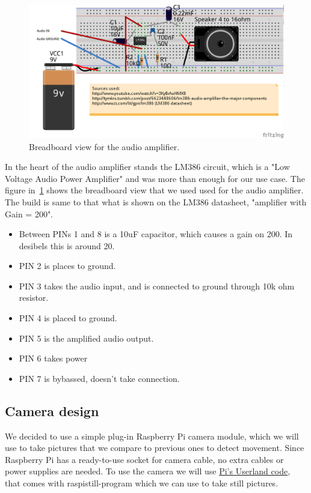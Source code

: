 \documentclass[english,11pt,twoside,a4paper]{article}
\begin{document}
\begin{figure}
  \begin{center}
    \includegraphics[scale=0.75]{audio_amplifier_lm386_bb.png}
    \caption{Breadboard view for the audio amplifier.}
  \end{center}
  \label{lm386_bb}
\end{figure}

In the heart of the audio amplifier stands the LM386 circuit, which is a "Low Voltage Audio Power Amplifier" and was more than enough for our use case. The figure in~\ref{lm386_bb} shows the breadboard view that we used used for the audio amplifier. The build is same to that what is shown on the LM386 datasheet, "amplifier with Gain = 200".

\begin{itemize}
  \item Between PINs 1 and 8 is a 10uF capacitor, which causes a gain on 200. In desibels this is around 20.
  \item PIN 2 is places to ground.
  \item PIN 3 takes the audio input, and is connected to ground through 10k ohm resistor.
  \item PIN 4 is placed to ground.
  \item PIN 5 is the amplified audio output.
  \item PIN 6 takes power
  \item PIN 7 is bybassed, doesn't take connection.
\end{itemize}

\subsection{Camera design}

We decided to use a simple plug-in Raspberry Pi camera module, which we will use to take pictures that we compare to previous ones to detect movement. Since Raspberry Pi has a ready-to-use socket for camera cable, no extra cables or power supplies are needed. To use the camera we will use \href{https://github.com/raspberrypi/userland}{Pi's Userland code}, that comes with raspistill-program which we can use to take still pictures.
\end{document}
